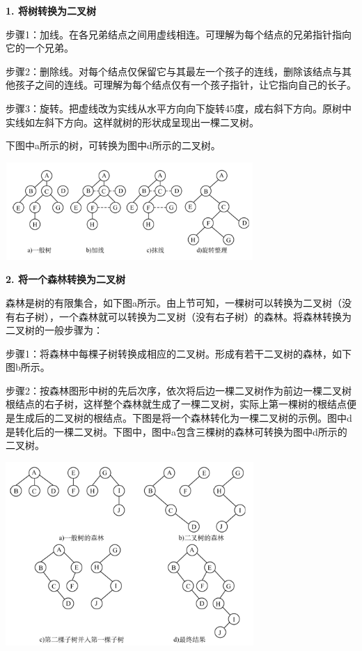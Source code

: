 {\textbf{1. 将树转换为二叉树}}

{{步骤1：加线。}在各兄弟结点之间用虚线相连。可理解为每个结点的兄弟指针指向它的一个兄弟。}

{{步骤2：}{删除线。}对每个结点仅保留它与其最左一个孩子的连线，删除该结点与其他孩子之间的连线。可理解为每个结点仅有一个孩子指针，让它指向自己的长子。}

{{步骤3：旋转。}把虚线改为实线从水平方向向下旋转45度，成右斜下方向。原树中实线如左斜下方向。这样就树的形状成呈现出一棵二叉树。}

{下图中a所示的树，可转换为图中d所示的二叉树。}

\includegraphics[width=3.70833in,height=1.45833in]{png-jpeg-pics/47A9E641635D85EE843D278FDFA2CB04.png}

{\textbf{2. 将一个森林转换为二叉树}}

{森林是树的有限集合，如下图a所示。由上节可知，一棵树可以转换为二叉树（没有右子树），一个森林就可以转换为二叉树（没有右子树）的森林。将森林转换为二叉树的一般步骤为：}

{{步骤1：}将森林中每棵子树转换成相应的二叉树。形成有若干二叉树的森林，如下图b所示。}

{{步骤2：}按森林图形中树的先后次序，依次将后边一棵二叉树作为前边一棵二叉树根结点的右子树，这样整个森林就生成了一棵二叉树，实际上第一棵树的根结点便是生成后的二叉树的根结点。下图是将一个森林转化为一棵二叉树的示例。图中d是转化后的一棵二叉树。下图中，图中a包含三棵树的森林可转换为图中d所示的二叉树。}

{\includegraphics[width=3.70833in,height=2.73958in]{png-jpeg-pics/8E1BB4B1D59EC35B61044A5A4531A9DF.png}\\
}

